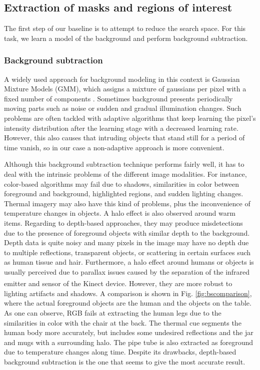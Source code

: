 \documentclass[10pt,twocolumn,letterpaper]{article}
\begin{document}
\subsection{Extraction of masks and regions of interest} 
\label{ssec:bsbb}

The first step of our baseline is to attempt to reduce the search space. For this task, we learn a model of the background and perform background subtraction.

\subsubsection{Background subtraction}
\label{sect:bs}
 A widely used approach for background modeling in this context is Gaussian Mixture Models (GMM), which assigns a mixture of gaussians per pixel with a fixed number of components \cite{bouwmans2008background}. Sometimes background presents periodically moving parts such as noise or sudden and gradual illumination changes. Such problems are often tackled with adaptive algorithms that keep learning the pixel's intensity distribution after the learning stage with a decreased learning rate. However, this also causes that intruding objects that stand still for a period of time vanish, so in our case a non-adaptive approach is more convenient.

Although this background subtraction technique performs fairly well, it has to deal with the intrinsic problems of the different image modalities. For instance, color-based algorithms may fail due to shadows, similarities in color between foreground and background, highlighted regions, and sudden lighting changes. Thermal imagery may also have this kind of problems, plus the inconvenience of temperature changes in objects. A halo effect is also observed around warm items. Regarding to depth-based approaches, they may produce misdetections due to the presence of foreground objects with similar depth to the background. Depth data is quite noisy and many pixels in the image may have no depth due to multiple reflections, transparent objects, or scattering in certain surfaces such as human tissue and hair. Furthermore, a halo effect around humans or objects is usually perceived due to parallax issues caused by the separation of the infrared emitter and sensor of the Kinect\textsuperscript{\texttrademark} device. However, they are more robust to lighting artifacts and shadows. A comparison is shown in Fig. \ref{fig:bscomparison}, where the actual foreground objects are the human and the objects on the table. As one can observe, RGB fails at extracting the human legs due to the similarities in color with the chair at the back. The thermal cue segments the human body more accurately, but includes some undesired reflections and the jar and mugs with a surrounding halo. The pipe tube is also extracted as foreground due to temperature changes along time. Despite its drawbacks, depth-based background subtraction is the one that seems to give the most accurate result. 
\end{document}
